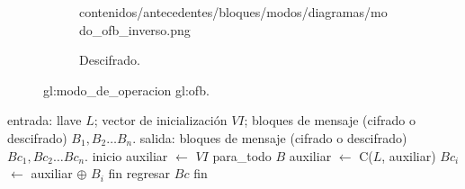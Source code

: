 \begin{figure}[H]
\begin{subfigure}{0.45\textwidth}
\begin{center}
        {contenidos/antecedentes/bloques/modos/diagramas/modo_ofb_inverso.png}
      \caption{Descifrado.}
    \end{center}
  \end{subfigure}
  \caption{\Gls{gl:modo_de_operacion} \acrshort{gl:ofb}.}
\end{figure}

\begin{pseudocodigo}[%
    caption={\Gls{gl:modo_de_operacion} \acrshort{gl:ofb}%
      (cifrado y descifrado).}%
    ]
  entrada: llave $ L $; vector de inicialización $ VI $;
           bloques de mensaje (cifrado o descifrado) $ B_1, B_2 \dots B_n $.
  salida:  bloques de mensaje (cifrado o descifrado) $ Bc_1, Bc_2 \dots Bc_n $.
  inicio
    auxiliar $\gets$ $ VI $
    para_todo $B$
      auxiliar $\gets$ C($L$, auxiliar)
      $Bc_i$ $\gets$  auxiliar $\oplus$ $B_i$
    fin
    regresar $Bc$
  fin
\end{pseudocodigo}
